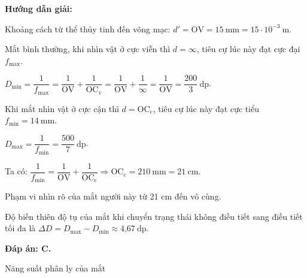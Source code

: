 {\begin{center}
	\textbf{Hướng dẫn giải:}
\end{center}

{ Khoảng cách từ thể thủy tinh đến võng mạc: $d'=\text{OV}= 15\ \text{mm}=15\cdot 10^{-3}\ \text{m}$.
	
	Mắt bình thường, khi nhìn vật ở cực viễn thì $d=\infty$, tiêu cự lúc này đạt cực đại $f_\text{max}$.
	
	$D_\text{min}=\dfrac{1}{f_\text{max}}=\dfrac{1}{\text{OV}}+\dfrac{1}{\text{OC}_\text{v}}=\dfrac{1}{\text{OV}}+\dfrac{1}{\infty}=\dfrac{1}{\text{OV}}=\dfrac{200}{3}\ \text{dp}$.
	
	Khi mắt nhìn vật ở cực cận thì $d=\text{OC}_\text{c}$, tiêu cự lúc này đạt cực tiểu $f_\text{min}=14\ \text{mm}$.
	
	$D_\text{max}=\dfrac{1}{f_\text{min}}=\dfrac{500}{7}\ \text{dp}$.
	
	Ta có: $\dfrac{1}{f_\text{min}}=\dfrac{1}{\text{OV}}+\dfrac{1}{\text{OC}_\text{c}}\Rightarrow \text{OC}_\text{c}=210\ \text{mm}=21\ \text{cm}$.
	
	Phạm vi nhìn rõ của mắt người này từ 21 cm đến vô cùng.
	
	Độ biến thiên độ tụ của mắt khi chuyển trạng thái không điều tiết sang điều tiết tối đa là $\Delta D=D_\text{max}-D_\text{min}\approx \text{4,67}\ \text{dp}$.
	
	
	
	
	
	
\textbf{	Đáp án: C.}
}
}
\begin{dang}{Năng suất phân ly của mắt}
\end{dang}

